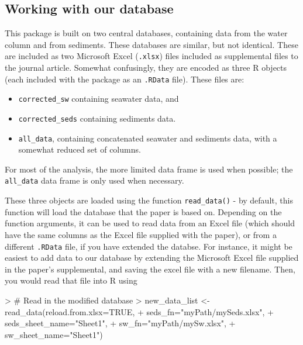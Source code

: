 \documentclass{article}
\begin{document}
\subsection{Working with our database}

This package is built on two central databases, containing data from the water column and from sediments. These databases are similar, but not identical. These are included as two Microsoft Excel (\texttt{.xlsx}) files included as supplemental files to the journal article. Somewhat confusingly, they are encoded as three R objects (each included with the package as an \texttt{.RData} file). These files are:

\begin{itemize}
  \item \texttt{corrected\_sw} containing seawater data, and
  \item \texttt{corrected\_seds} containing sediments data.
  \item \texttt{all\_data}, containing concatenated seawater and sediments data, with a somewhat reduced set of columns. 
\end{itemize}

For most of the analysis, the more limited data frame is used when possible; the \texttt{all\_data} data frame is only used when necessary.

These three objects are loaded using the function \texttt{read\_data()} - by default, this function will load the database that the paper is based on. Depending on the function arguments, it can be used to read data from an Excel file (which should have the same columns as the Excel file supplied with the paper), or from a different \texttt{.RData} file, if you have extended the databse. For instance, it might be easiest to add data to our database by extending the Microsoft Excel file supplied in the paper's supplemental, and saving the excel file with a new filename. Then, you would read that file into R using

\begin{Schunk}
\begin{Sinput}
> # Read in the modified database
> new_data_list <- read_data(reload.from.xlsx=TRUE, 
+                            seds_fn="myPath/mySeds.xlsx", 
+                            seds_sheet_name="Sheet1",
+                            sw_fn="myPath/mySw.xlsx", 
+                            sw_sheet_name="Sheet1")
\end{Sinput}
\end{Schunk}
\end{document}
